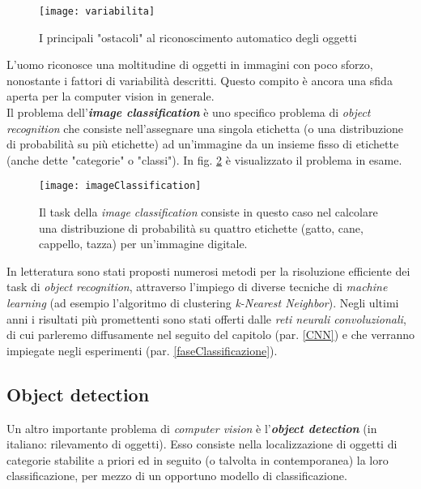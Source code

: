 \begin{figure}[h]
\centering
\texttt{[image: variabilita]}
\caption{I principali "ostacoli" al riconoscimento automatico degli oggetti} 
\label{fig:variabilita}
\end{figure}

L'uomo riconosce una moltitudine di oggetti in immagini con poco sforzo, nonostante i fattori di variabilità descritti. Questo compito è ancora una sfida aperta per la computer vision in generale.\\

Il problema dell'\textbf{\textit{image classification}} è uno specifico problema di \textit{object recognition} che consiste nell'assegnare una singola etichetta (o una distribuzione di probabilità su più etichette) ad un'immagine da un insieme fisso di etichette (anche dette "categorie" o "classi"). In fig. \ref{fig:imageClassification} è visualizzato il problema in esame.

\begin{figure}[h]
\centering
\texttt{[image: imageClassification]}
\caption{Il task della \textit{image classification} consiste in questo caso nel calcolare una distribuzione di probabilità su quattro etichette (gatto, cane, cappello, tazza) per un'immagine digitale.} 
\label{fig:imageClassification}
\end{figure}

In letteratura sono stati proposti numerosi metodi per la risoluzione efficiente dei task di \textit{object recognition}, attraverso l'impiego di diverse tecniche di \textit{machine learning} (ad esempio l'algoritmo di clustering \textit{k-Nearest Neighbor}). Negli ultimi anni i risultati più promettenti sono stati offerti dalle \textit{reti neurali convoluzionali}, di cui parleremo diffusamente nel seguito del capitolo (par. \ref{CNN}) e che verranno impiegate negli esperimenti (par. \ref{faseClassificazione}).

\subsection{Object detection}
\label{objectDetection}
Un altro importante problema di \textit{computer vision} è l'\textbf{\textit{object detection}} (in italiano: rilevamento di oggetti). Esso consiste nella localizzazione di oggetti di categorie stabilite a priori ed in seguito (o talvolta in contemporanea) la loro classificazione, per mezzo di un opportuno modello di classificazione.

